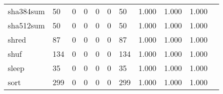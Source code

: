 \begin{longtable}{lp{1.2cm}p{1.2cm}p{1.2cm}p{1.2cm}p{1.2cm}p{1.2cm}p{1.2cm}p{1.2cm}p{1.2cm}p{1.2cm}}
sha384sum &                                    50 &                                                  0 &                                                  0 &                                                  0 &                                                  0 &                                                 50 &                                              1.000 &                                              1.000 &                                              1.000 \\
sha512sum &                                    50 &                                                  0 &                                                  0 &                                                  0 &                                                  0 &                                                 50 &                                              1.000 &                                              1.000 &                                              1.000 \\
shred     &                                    87 &                                                  0 &                                                  0 &                                                  0 &                                                  0 &                                                 87 &                                              1.000 &                                              1.000 &                                              1.000 \\
shuf      &                                   134 &                                                  0 &                                                  0 &                                                  0 &                                                  0 &                                                134 &                                              1.000 &                                              1.000 &                                              1.000 \\
sleep     &                                    35 &                                                  0 &                                                  0 &                                                  0 &                                                  0 &                                                 35 &                                              1.000 &                                              1.000 &                                              1.000 \\
sort      &                                   299 &                                                  0 &                                                  0 &                                                  0 &                                                  0 &                                                299 &                                              1.000 &                                              1.000 &                                              1.000 \\

\end{longtable}
